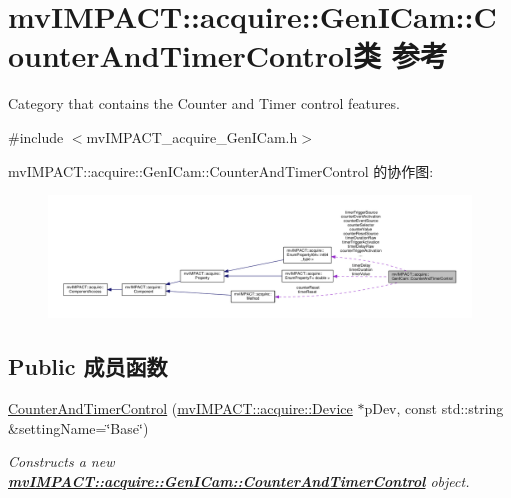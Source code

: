 \hypertarget{classmv_i_m_p_a_c_t_1_1acquire_1_1_gen_i_cam_1_1_counter_and_timer_control}{\section{mv\+I\+M\+P\+A\+C\+T\+:\+:acquire\+:\+:Gen\+I\+Cam\+:\+:Counter\+And\+Timer\+Control类 参考}
\label{classmv_i_m_p_a_c_t_1_1acquire_1_1_gen_i_cam_1_1_counter_and_timer_control}
}


Category that contains the Counter and Timer control features.  




{\ttfamily \#include $<$mv\+I\+M\+P\+A\+C\+T\+\_\+acquire\+\_\+\+Gen\+I\+Cam.\+h$>$}



mv\+I\+M\+P\+A\+C\+T\+:\+:acquire\+:\+:Gen\+I\+Cam\+:\+:Counter\+And\+Timer\+Control 的协作图\+:
\nopagebreak
\begin{figure}[H]
\begin{center}
\leavevmode
\includegraphics[width=350pt]{classmv_i_m_p_a_c_t_1_1acquire_1_1_gen_i_cam_1_1_counter_and_timer_control__coll__graph}
\end{center}
\end{figure}
\subsection*{Public 成员函数}
\begin{DoxyCompactItemize}
\item 
\hyperlink{classmv_i_m_p_a_c_t_1_1acquire_1_1_gen_i_cam_1_1_counter_and_timer_control_a9ca851d25166e401670195607f772ef4}{Counter\+And\+Timer\+Control} (\hyperlink{classmv_i_m_p_a_c_t_1_1acquire_1_1_device}{mv\+I\+M\+P\+A\+C\+T\+::acquire\+::\+Device} $\ast$p\+Dev, const std\+::string \&setting\+Name=\char`\"{}Base\char`\"{})
\begin{DoxyCompactList}\small\item\em Constructs a new {\bfseries \hyperlink{classmv_i_m_p_a_c_t_1_1acquire_1_1_gen_i_cam_1_1_counter_and_timer_control}{mv\+I\+M\+P\+A\+C\+T\+::acquire\+::\+Gen\+I\+Cam\+::\+Counter\+And\+Timer\+Control}} object. \end{DoxyCompactList}\end{DoxyCompactItemize}
